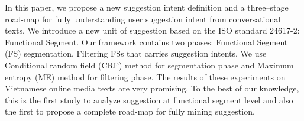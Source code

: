 In this paper, we propose a new suggestion intent definition and a three--stage road-map for fully understanding user suggestion intent from conversational texts. We introduce a new unit of suggestion based on the ISO standard 24617-2: Functional Segment. Our framework contains two phases: Functional Segment (FS) segmentation, Filtering FSs that carries suggestion intents. We use Conditional random field (CRF) method for segmentation phase and Maximum entropy (ME) method for filtering phase. The results of these experiments on Vietnamese online media texts are very promising. To the best of our knowledge, this is the first study to analyze suggestion at functional segment level and also the first to propose a complete road-map for fully mining suggestion.

